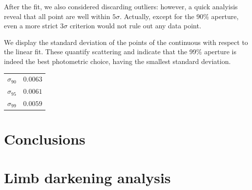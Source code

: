 \documentclass[a4paper,11pt,twocolumn]{article}
\begin{document}
After the fit, we also considered discarding outliers: however, a quick 
analyisis reveal that all point are well within $5\sigma$. Actually, 
except for the 90\% aperture, even a more strict $3\sigma$ criterion 
would not rule out any data point.

We display the standard deviation of the points of the 
continuous with respect to the linear fit. These quantify scattering and 
indicate that the 99\% aperture is indeed the best photometric choice, 
having the smallest standard deviation.
\begin{center}
    \begin{tabular}{|c|c|}
    \hline
    $\sigma_{90}$ & $0.0063$ \\
    $\sigma_{95}$ & $0.0061$ \\
    $\sigma_{99}$ & $0.0059$ \\
    \hline
    \end{tabular}
\end{center}







\newpage
\section{Conclusions}















\appendix
\section{Limb darkening analysis}
\label{sect:app_A}
\end{document}
